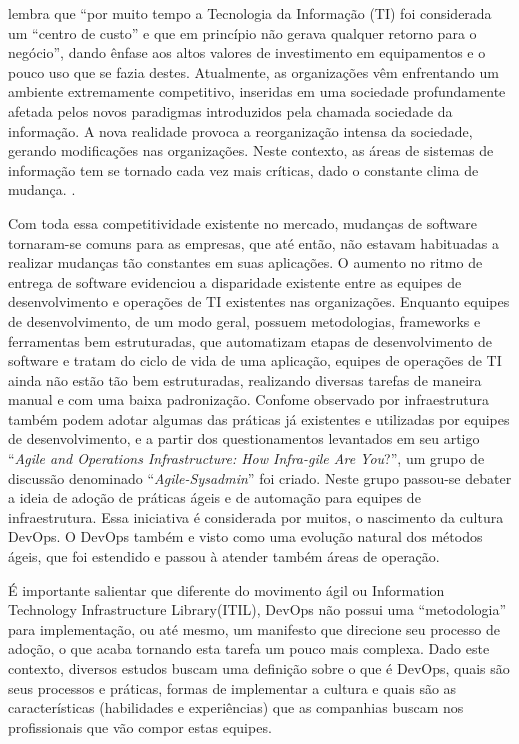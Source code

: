 \documentclass[twoside,english,brazilian]{UNISINOSartigo}
\begin{document}
 lembra que ``por muito tempo a Tecnologia da Informação (TI) foi considerada um ``centro de custo''  e que em princípio não gerava qualquer retorno para o negócio'', dando ênfase aos altos valores de investimento em equipamentos e o pouco uso que se fazia destes.  Atualmente, as organizações vêm enfrentando um ambiente extremamente competitivo, inseridas em uma sociedade profundamente afetada pelos novos paradigmas introduzidos pela chamada sociedade da informação. A nova realidade provoca a reorganização intensa da sociedade, gerando modificações nas organizações. Neste contexto, as áreas de sistemas de informação tem se tornado cada vez mais críticas, dado o constante clima de mudança.  \cite[p. 15]{AudyFreitag08}.

Com toda essa competitividade existente no mercado, mudanças de software tornaram-se comuns para as empresas, que até então, não estavam habituadas a realizar mudanças tão constantes em suas aplicações. O aumento no ritmo de entrega de software evidenciou a disparidade existente entre as equipes de desenvolvimento e operações de TI existentes nas organizações. Enquanto equipes de desenvolvimento, de um modo geral, possuem metodologias, frameworks e ferramentas bem estruturadas, que automatizam etapas de desenvolvimento de software e tratam do ciclo de vida de uma aplicação, equipes de operações de TI ainda  não estão tão bem estruturadas, realizando diversas tarefas de maneira manual e com uma baixa padronização. 
Confome observado por  infraestrutura também podem adotar algumas das práticas já existentes e utilizadas por equipes de desenvolvimento, e a partir dos questionamentos levantados em seu artigo ``\textit{Agile and Operations Infrastructure: How Infra-gile Are You}?'', um grupo de discussão denominado ``\textit{Agile-Sysadmin}''  foi criado. Neste grupo passou-se debater a ideia de adoção de práticas ágeis e de automação para equipes de infraestrutura. Essa iniciativa é considerada por muitos, o nascimento da cultura DevOps. O DevOps também e visto como uma evolução natural dos métodos ágeis, que foi estendido e passou à atender também áreas de operação. 

É importante salientar que diferente do movimento ágil ou Information Technology Infrastructure Library(ITIL), DevOps não possui uma ``metodologia'' para implementação, ou até mesmo, um manifesto que direcione seu processo de adoção, o que acaba tornando esta tarefa um pouco mais complexa. Dado este contexto, diversos estudos buscam uma definição sobre o que é DevOps, quais são seus processos e práticas, formas de implementar a cultura e quais são as características (habilidades e experiências) que as companhias buscam nos profissionais que vão compor estas equipes.
\end{document}
